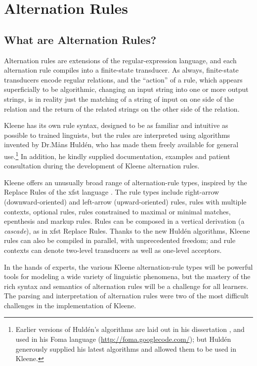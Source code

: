 \chapter{Alternation Rules}

\label{chapt:alternationrules}

\section{What are Alternation Rules?}

Alternation rules are extensions of the regular-expression language, and each alternation rule compiles into a
finite-state transducer.  As always, finite-state transducers encode regular relations, and the ``action'' of a rule,
which appears superficially to be algorithmic, changing an input string into one or more output strings, is in
reality just the matching of a string of input on one side of the relation and the return of the related strings on the
other side of the relation.

Kleene has its own rule syntax, designed to be as familiar and intuitive as possible to trained linguists, but the
rules are interpreted using algorithms invented by Dr.\@ M\r{a}ns Huldén, who has made them freely available for
general use.\footnote{Earlier versions of Huldén's algorithms are laid
out in his dissertation \citep{hulden:2009thesis}, and
used in his Foma language (\url{http://foma.googlecode.com/});
but Huldén generously supplied his latest algorithms and
allowed them to be used in Kleene.}  In addition, he kindly supplied
documentation, examples and patient consultation
during the development of Kleene alternation rules.  

Kleene offers an unusually broad range of alternation-rule types, inspired by the Replace Rules of the xfst
language \citep{beesley+karttunen:2003}.  The rule types include right-arrow (downward-oriented) and
left-arrow (upward-oriented) rules, rules with multiple contexts, optional rules, rules constrained
to maximal or minimal matches, epenthesis and markup rules.   Rules can be composed in a vertical
derivation (a \emph{cascade}), as in xfst Replace Rules.  Thanks to the
new Huldén algorithms, Kleene rules can
also be compiled in parallel, with unprecedented freedom; and rule contexts can denote two-level
transducers as well as one-level acceptors.

In the hands of experts, the various Kleene alternation-rule types will be powerful tools for
modeling a wide variety of linguistic phenomena, but the mastery of the rich syntax and semantics of
alternation rules will be a challenge for all learners.  The
	parsing and interpretation of alternation rules were two of the most
difficult challenges in the implementation of Kleene.

